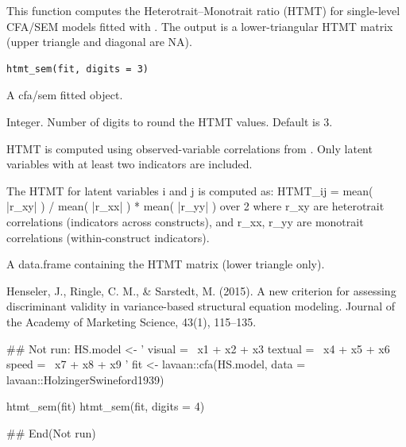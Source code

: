 \documentclass[a4paper]{book}
\begin{document}
%
\begin{Description}
This function computes the Heterotrait–Monotrait ratio (HTMT)
for single-level CFA/SEM models fitted with .
The output is a lower-triangular HTMT matrix (upper triangle and diagonal are NA).
\end{Description}
%
\begin{Usage}
\begin{verbatim}
htmt_sem(fit, digits = 3)
\end{verbatim}
\end{Usage}
%
\begin{Arguments}
\begin{ldescription}
\item[\code{fit}] A  cfa/sem fitted object.

\item[\code{digits}] Integer. Number of digits to round the HTMT values. Default is 3.
\end{ldescription}
\end{Arguments}
%
\begin{Details}
HTMT is computed using observed-variable correlations from
.
Only latent variables with at least two indicators are included.

The HTMT for latent variables i and j is computed as:
HTMT\_ij = mean( |r\_xy| ) /  mean( |r\_xx| ) * mean( |r\_yy| )  over 2
where r\_xy are heterotrait correlations (indicators across constructs),
and r\_xx, r\_yy are monotrait correlations (within-construct indicators).
\end{Details}
%
\begin{Value}
A data.frame containing the HTMT matrix (lower triangle only).
\end{Value}
%
\begin{References}
Henseler, J., Ringle, C. M., \& Sarstedt, M. (2015).
A new criterion for assessing discriminant validity in variance-based
structural equation modeling. Journal of the Academy of Marketing Science,
43(1), 115–135.
\end{References}
%
\begin{Examples}
\begin{ExampleCode}
\#\# Not run: 
HS.model <- '
  visual  =~ x1 + x2 + x3
  textual =~ x4 + x5 + x6
  speed   =~ x7 + x8 + x9
'
fit <- lavaan::cfa(HS.model, data = lavaan::HolzingerSwineford1939)

htmt_sem(fit)
htmt_sem(fit, digits = 4)

## End(Not run)
\end{ExampleCode}
\end{Examples}
\end{document}
